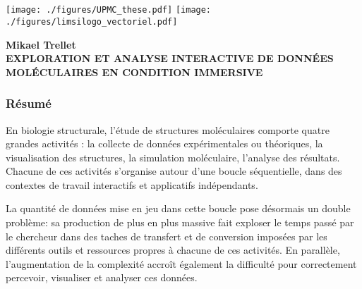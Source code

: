 \backmatter 
\chapter*{}%
\pagestyle{empty}

\setlength{\headheight}{0.pt}
        
\texttt{[image: ./figures/UPMC\_these.pdf]}\hfill
\texttt{[image: ./figures/limsilogo\_vectoriel.pdf]}\hfill


\begin{center}
 \textbf{Mikael Trellet} \\
 \textbf{EXPLORATION ET ANALYSE INTERACTIVE DE DONNÉES MOLÉCULAIRES EN CONDITION IMMERSIVE}
\end{center}
    

\footnotesize
\subsection*{Résumé}












\footnotesize
En biologie structurale, l'étude de structures moléculaires comporte quatre grandes activités : la collecte de données expérimentales ou théoriques, la visualisation des structures, la simulation moléculaire, l'analyse des résultats. Chacune de ces activités s'organise autour d'une boucle séquentielle, dans des contextes de travail interactifs et applicatifs indépendants.

La quantité de données mise en jeu dans cette boucle pose désormais un double problème: sa production de plus en plus massive fait exploser le temps passé par le chercheur dans des taches de transfert et de conversion imposées par les différents outils et ressources propres à chacune de ces activités. En parallèle, l'augmentation de la complexité accroît également la difficulté pour correctement percevoir, visualiser et analyser ces données.

